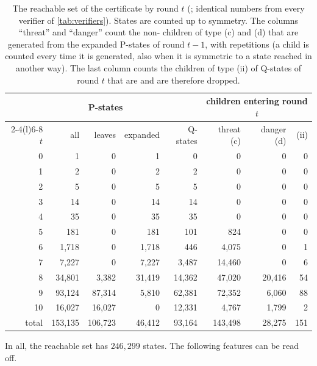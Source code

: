 \begin{table}[ht]
\centering\small
\begin{tabular}{@{}rrrrrrrr@{}}
\toprule
 & \multicolumn{3}{c}{P-states} & & \multicolumn{3}{c}{children entering round $t$}\\
\cmidrule(lr){2-4}\cmidrule(l){6-8}
$t$ & all & leaves & expanded & Q-states & threat (c) & danger (d) & \VOID{} (ii)\\
\midrule
 0 & 1 & 0 & 1 & 0 & 0 & 0 & 0\\
 1 & 2 & 0 & 2 & 2 & 0 & 0 & 0\\
 2 & 5 & 0 & 5 & 5 & 0 & 0 & 0\\
 3 & 14 & 0 & 14 & 14 & 0 & 0 & 0\\
 4 & 35 & 0 & 35 & 35 & 0 & 0 & 0\\
 5 & 181 & 0 & 181 & 101 & 824 & 0 & 0\\
 6 & 1{,}718 & 0 & 1{,}718 & 446 & 4{,}075 & 0 & 1\\
 7 & 7{,}227 & 0 & 7{,}227 & 3{,}487 & 14{,}460 & 0 & 6\\
 8 & 34{,}801 & 3{,}382 & 31{,}419 & 14{,}362 & 47{,}020 & 20{,}416 & 54\\
 9 & 93{,}124 & 87{,}314 & 5{,}810 & 62{,}381 & 72{,}352 & 6{,}060 & 88\\
10 & 16{,}027 & 16{,}027 & 0 & 12{,}331 & 4{,}767 & 1{,}799 & 2\\
\midrule
total & 153{,}135 & 106{,}723 & 46{,}412 & 93{,}164 & 143{,}498 & 28{,}275 & 151\\
\bottomrule
\end{tabular}
\caption{The reachable set of the certificate by round $t$ (; identical
numbers from every verifier of \cref{tab:verifiers}). States are counted up to symmetry. The columns
``threat'' and ``danger'' count the non-\VOID{} children of type (c) and (d) that are generated from the
expanded P-states of round $t-1$, with repetitions (a child is counted every time it is generated, also when
it is symmetric to a state reached in another way). The last column counts the children of type (ii) of
Q-states of round $t$ that are \VOID{} and are therefore dropped.}
\label{tab:tree}
\end{table}

In all, the reachable set has $246{,}299$ states. The following features can be read off.

